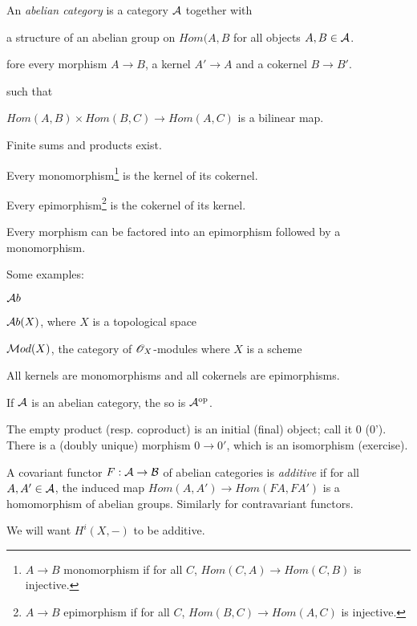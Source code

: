 
\begin{definition}
 An \emph{abelian category} is a category $\mathcal{A}$ together with
\begin{list}{}{}
 \item[(i)] a structure of an abelian group on $Hom(A,B$ for all
objects $A,B\in \mathcal{A}$.
 \item[(ii)] fore every morphism $A\to B$, a kernel $A'\to A$ and a
 cokernel $B\to B'$.
\end{list}
such that
\begin{list}{}{}
 \item[(1)] $Hom(A,B)\times Hom(B,C) \to Hom(A,C)$ is a bilinear
map.
 \item[(2)] Finite sums and products exist.
 \item[(3)] Every monomorphism\footnote{$A\to B$ monomorphism if
    for all $C$, $Hom(C,A)\to Hom(C,B)$ is injective.} is the kernel of its
    cokernel.
 \item[(4)] Every epimorphism\footnote{$A\to B$ epimorphism if for all $C$, $Hom(B,C)\to
    Hom(A,C)$ is injective.} is the cokernel of its kernel.
 \item[(5)] Every morphism can be factored into an epimorphism
 followed by a monomorphism.
\end{list}
\end{definition}

Some examples:
\begin{list}{}{}
 \item $\mathcal{A}b$
 \item $\mathcal{A}b(X)$, where $X$ is a topological space
 \item $\mathcal{M}od(X)$, the category of $\mathscr{O}_X$-modules where $X$ is a
 scheme
\end{list}

\begin{remark}\begin{list}{}{}
 \item[-] All kernels are monomorphisms and all cokernels are epimorphisms.
 \item[-] If $\mathcal{A}$ is an abelian category, the so is
 $\mathcal{A}^{\text{op}}$.
 \item[-] The empty product (resp. coproduct) is an initial
 (final) object; call it 0 (0').  There is a (doubly unique)
 morphism $0\to 0'$, which is an isomorphism (exercise).
\end{list}\end{remark}

\begin{definition}
A covariant functor $F:\mathcal{A} \to \mathcal{B}$ of abelian categories
is \emph{additive} if for all $A,A'\in \mathcal{A}$, the induced map
$Hom(A,A')\to Hom(FA,FA')$ is a homomorphism of abelian groups.
Similarly for contravariant functors.
\end{definition}
We will want $H^i(X,-)$ to be additive.

